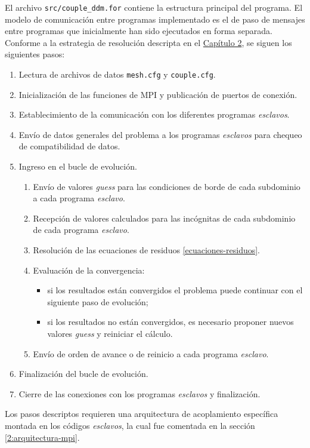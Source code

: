 El archivo \texttt{src/couple\_ddm.for} contiene la estructura principal del programa.
El modelo de comunicación entre programas implementado es el de paso de mensajes entre programas que inicialmente han sido ejecutados en forma separada.
Conforme a la estrategia de resolución descripta en el \hyperlink{chapter.2}{Capítulo 2}, se siguen los siguientes pasos:
\begin{enumerate}
\item Lectura de archivos de datos \texttt{mesh.cfg} y \texttt{couple.cfg}.
\item Inicialización de las funciones de MPI y publicación de puertos de conexión.
\item Establecimiento de la comunicación con los diferentes programas \textit{esclavos}.
\item Envío de datos generales del problema a los programas \textit{esclavos} para chequeo de compatibilidad de datos.
\item Ingreso en el bucle de evolución.
\begin{enumerate}
\item Envío de valores \textit{guess} para las condiciones de borde de cada subdominio a cada programa \textit{esclavo}.
\item Recepción de valores calculados para las incógnitas de cada subdominio de cada programa \textit{esclavo}.
\item Resolución de las ecuaciones de residuos \ref{ecuaciones-residuos}.
\item Evaluación de la convergencia:
\begin{itemize}
\item si los resultados están convergidos el problema puede continuar con el siguiente paso de evolución;
\item si los resultados no están convergidos, es necesario proponer nuevos valores \textit{guess} y reiniciar el cálculo.
\end{itemize}
\item Envío de orden de avance o de reinicio a cada programa \textit{esclavo}.
\end{enumerate}
\item Finalización del bucle de evolución.
\item Cierre de las conexiones con los programas \textit{esclavos} y finalización.
\end{enumerate}
Los pasos descriptos requieren una arquitectura de acoplamiento específica montada en los códigos \textit{esclavos}, la cual fue comentada en la sección \ref{2:arquitectura-mpi}.

